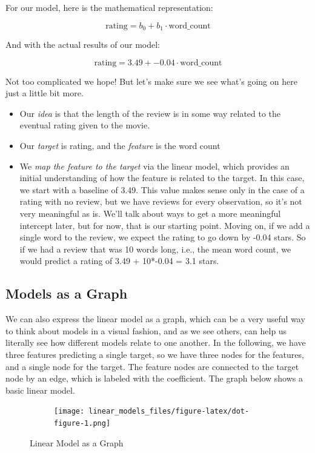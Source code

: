 \documentclass[
  letterpaper,
]{krantz}
\providecommand{\tightlist}{%
  \setlength{\itemsep}{0pt}\setlength{\parskip}{0pt}}\usepackage{longtable,booktabs,array}
\begin{document}
For our model, here is the mathematical representation:

\[
\textrm{rating} = b_0 + b_1 \cdot \textrm{word\_count}
\]

And with the actual results of our model:

\[
\textrm{rating} = 3.49 + -0.04 \cdot \textrm{word\_count}
\]

Not too complicated we hope! But let's make sure we see what's going on
here just a little bit more.

\begin{itemize}
\tightlist
\item
  Our \emph{idea} is that the length of the review is in some way
  related to the eventual rating given to the movie.
\item
  Our \emph{target} is rating, and the \emph{feature} is the word count
\item
  We \emph{map the feature to the target} via the linear model, which
  provides an initial understanding of how the feature is related to the
  target. In this case, we start with a baseline of 3.49. This value
  makes sense only in the case of a rating with no review, but we have
  reviews for every observation, so it's not very meaningful as is.
  We'll talk about ways to get a more meaningful intercept later, but
  for now, that is our starting point. Moving on, if we add a single
  word to the review, we expect the rating to go down by -0.04 stars. So
  if we had a review that was 10 words long, i.e., the mean word count,
  we would predict a rating of 3.49 + 10*-0.04 = 3.1 stars.
\end{itemize}

\subsection{Models as a Graph}\label{models-as-a-graph}

We can also express the linear model as a graph, which can be a very
useful way to think about models in a visual fashion, and as we see
others, can help us literally see how different models relate to one
another. In the following, we have three features predicting a single
target, so we have three nodes for the features, and a single node for
the target. The feature nodes are connected to the target node by an
edge, which is labeled with the coefficient. The graph below shows a
basic linear model.

\begin{figure}

{\centering 

\begin{figure}[H]

{\centering \texttt{[image: linear\_models\_files/figure-latex/dot-figure-1.png]}

}

\end{figure}

}

\caption{\label{fig-graph-lm}Linear Model as a Graph}

\end{figure}
\end{document}
